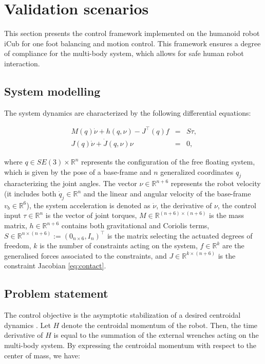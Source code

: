 \documentclass[final,5p,twocolumn]{elsarticle}
\newcommand{\Rv}[1]{{\mathbb{R}^{#1}}}				%
\newcommand{\R}[2]{{\mathbb{R}^{#1\times #2}}}		%
\begin{document}
\section{Validation scenarios}

This section presents the control framework implemented on the humanoid robot iCub for one foot balancing and motion control. This framework ensures a degree of compliance for the multi-body system, which allows for safe human robot interaction.

\subsection{System modelling}
The system dynamics are characterized by the following  differential equations:

\begin{eqnarray}\label{eq:dyn}
\label{eq:dynNoContacts}
M(q) \dot{\nu} + h(q, \nu) - J^\top(q) f  &=&
{S} \tau \mbox{,}\\
\label{eq:contact}
 J(q) \dot{\nu} + \dot{J}(q, \nu) \nu &=& 0 \mbox{,}
 \end{eqnarray}

\noindent
where $q \in SE(3) \times \Rv{n}$ represents the configuration of the free floating system,
 which is given by the
pose of a base-frame and $n$ generalized coordinates $q_j$ characterizing the joint angles.
The vector $\nu \in \Rv{n+6}$ represents the robot velocity
(it includes both $\dot{q}_j \in \Rv{n}$ and the linear and angular velocity of the base-frame $v_b \in \Rv{6}$), the system acceleration is denoted as $\dot \nu$,
the derivative of $\nu$, the control input
$\tau \in \Rv{n}$ is the vector of joint torques, $M \in \R{(n+6)}{(n+6)}$ is the mass matrix, $h \in \Rv{n+6}$ contains both
gravitational and Coriolis terms, $S \in \R{n}{(n+6)} := (0_{n\times 6}, I_n)^\top$ is the matrix selecting the actuated degrees of freedom, $k$ is the number of constraints acting on the system, $f \in \Rv{k}$ are the generalised forces associated to the constraints, and $J \in \R{k}{(n+6)}$ is the constraint Jacobian \eqref{eq:contact}.


\subsection{Problem statement}

The control objective is the asymptotic stabilization of a desired centroidal dynamics \cite{Orin2013}. Let $H$
denote the centroidal momentum of the robot. Then, the time derivative of $H$ is equal to the summation of the external wrenches acting on the multi-body system. By expressing the centroidal momentum with respect to the center of mass, we have:
\end{document}
